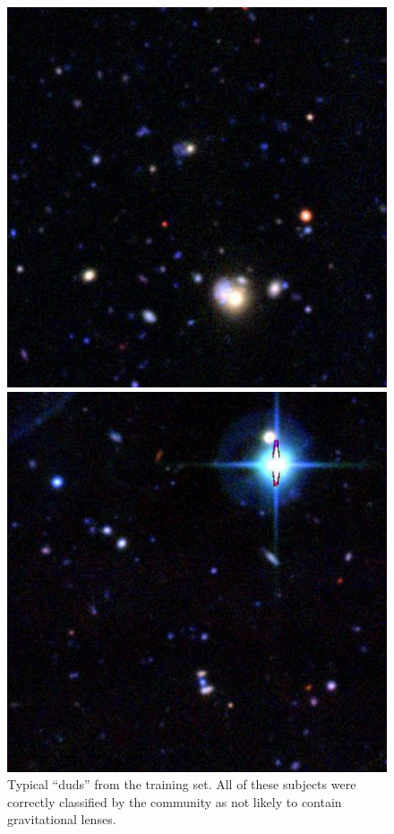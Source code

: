 \documentclass[useAMS,usenatbib,a4paper]{mn2e}
\begin{document}
\begin{figure}
\begin{minipage}[b]{0.24\linewidth}
\end{minipage} \hfill
\begin{minipage}[b]{0.24\linewidth}
\centering\includegraphics[width=\linewidth]{2.pdf}
\end{minipage} \hfill
\begin{minipage}[b]{0.24\linewidth}
\centering\includegraphics[width=\linewidth]{3.pdf}
\end{minipage} \hfill
\caption{Typical \SW ``duds'' from the \StageTwo training set. All of these
subjects were correctly classified by the community as not likely to contain
gravitational lenses.} \label{fig:training-gallery:duds}
\end{figure}
\end{document}
